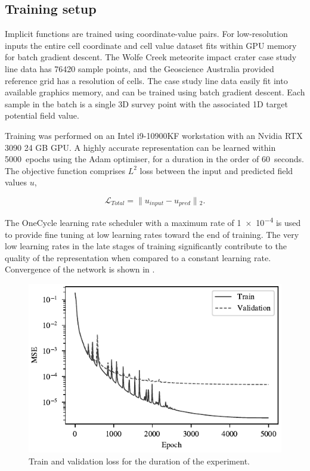 \documentclass[manuscript.tex]{subfiles}
\begin{document}
\subsection{Training setup}
\label{sec:training}

Implicit functions are trained using coordinate-value pairs.
For low-resolution inputs the entire cell coordinate and cell value dataset fits within GPU memory for batch gradient descent.
The Wolfe Creek meteorite impact crater case study line data has \num{76420} sample points, and the Geoscience Australia provided reference grid has a resolution of  cells.
The case study line data easily fit into available graphics memory, and can be trained using batch gradient descent.
Each sample in the batch is a single 3D survey point with the associated 1D target potential field value.

Training was performed on an Intel i9-10900KF workstation with an Nvidia RTX 3090 24 GB GPU\@.
A highly accurate representation can be learned within \qty{5000}{epochs} using the Adam optimiser, for a duration in the order of \qty{60}{seconds}.
The objective function comprises \(L^2\) loss between the input and predicted field values \(u\),

\begin{equation}
    \label{eqn:cri}
    \mathcal{L}_{Total} = \lVert{}u_{input} - u_{pred}\rVert{}_{2}. %
\end{equation}

The OneCycle learning rate scheduler \parencite{smithSuperconvergenceVeryFast2018} with a maximum rate of \num{1e-4} is used to provide fine tuning at low learning rates toward the end of training.
The very low learning rates in the late stages of training significantly contribute to the quality of the representation when compared to a constant learning rate.
Convergence of the network is shown in .


\begin{figure}[hbt]
    \centering{}
    \includegraphics[width=0.5\linewidth]{fig/p3/loss_plot.pdf}
    \caption[Training convergence]{Train and validation loss for the duration of the experiment.}
    \label{fig:convergence}
\end{figure}
\end{document}
